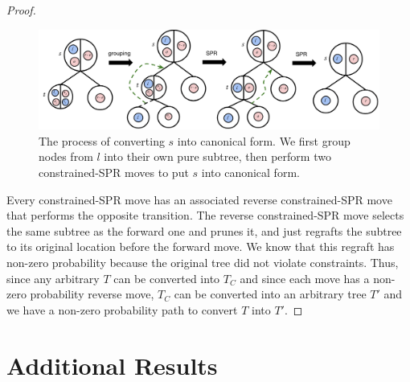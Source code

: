 \begin{proof}
\begin{figure}
    \centering
    \includegraphics[width=\textwidth]{img/ibhc/CanonicalTree}
    \caption{The process of converting $s$ into canonical form.
    We first group nodes from $l$ into their own pure subtree, then perform
    two constrained-SPR moves to put $s$ into canonical form.}
    \label{fig:supcanonical}
\end{figure}

Every constrained-SPR move has an associated reverse constrained-SPR move that
performs the opposite transition.
The reverse constrained-SPR move selects the same subtree as the forward one
and prunes it, and just regrafts the subtree to its original location
before the forward move.
We know that this regraft has non-zero probability because the original tree
did not violate constraints.
Thus, since any arbitrary $T$ can be converted into $T_C$ and since each move
has a non-zero probability reverse move,
$T_C$ can be converted into an arbitrary tree $T'$ and we have a non-zero probability
path to convert $T$ into $T'$.

\end{proof}

\section{Additional Results}

